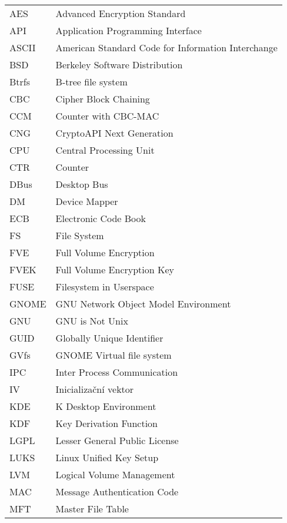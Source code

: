 
\seznamzkr

\setlength{\LTleft}{0pt}
\begin{longtable}{ll}
  AES & Advanced Encryption Standard \\
  API & Application Programming Interface \\
  ASCII & American Standard Code for Information Interchange \\
  BSD & Berkeley Software Distribution \\
  Btrfs & B-tree file system \\
  CBC & Cipher Block Chaining \\
  CCM & Counter with CBC-MAC \\
  CNG & CryptoAPI Next Generation \\
  CPU & Central Processing Unit \\
  CTR & Counter \\
  DBus & Desktop Bus \\
  DM & Device Mapper \\
  ECB & Electronic Code Book \\
  FS &  File System \\
  FVE & Full Volume Encryption \\
  FVEK & Full Volume Encryption Key \\
  FUSE & Filesystem in Userspace \\
  GNOME & GNU Network Object Model Environment \\
  GNU & GNU is Not Unix \\
  GUID & Globally Unique Identifier \\
  GVfs & GNOME Virtual file system \\
  IPC & Inter Process Communication \\
  IV & Inicializační vektor \\
  KDE & K Desktop Environment \\
  KDF & Key Derivation Function \\
  LGPL & Lesser General Public License \\
  LUKS & Linux Unified Key Setup \\
  LVM & Logical Volume Management \\
  MAC & Message Authentication Code \\
  MFT & Master File Table \\

\end{longtable}
